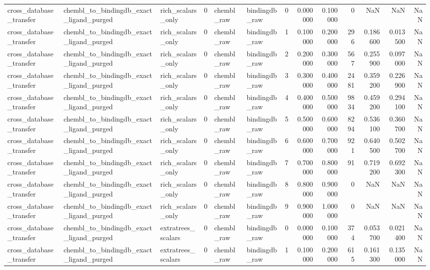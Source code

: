 \begin{longtable}{lllrllrrrrrrr}
cross\_database\_transfer & chembl\_to\_bindingdb\_exact\_ligand\_purged & rich\_scalars\_only & 0 & chembl\_raw & bindingdb\_raw & 0 & 0.000000 & 0.100000 & 0 & NaN & NaN & NaN \\
cross\_database\_transfer & chembl\_to\_bindingdb\_exact\_ligand\_purged & rich\_scalars\_only & 0 & chembl\_raw & bindingdb\_raw & 1 & 0.100000 & 0.200000 & 296 & 0.186600 & 0.013500 & NaN \\
cross\_database\_transfer & chembl\_to\_bindingdb\_exact\_ligand\_purged & rich\_scalars\_only & 0 & chembl\_raw & bindingdb\_raw & 2 & 0.200000 & 0.300000 & 567 & 0.255900 & 0.097000 & NaN \\
cross\_database\_transfer & chembl\_to\_bindingdb\_exact\_ligand\_purged & rich\_scalars\_only & 0 & chembl\_raw & bindingdb\_raw & 3 & 0.300000 & 0.400000 & 2481 & 0.359200 & 0.226900 & NaN \\
cross\_database\_transfer & chembl\_to\_bindingdb\_exact\_ligand\_purged & rich\_scalars\_only & 0 & chembl\_raw & bindingdb\_raw & 4 & 0.400000 & 0.500000 & 9834 & 0.459200 & 0.294100 & NaN \\
cross\_database\_transfer & chembl\_to\_bindingdb\_exact\_ligand\_purged & rich\_scalars\_only & 0 & chembl\_raw & bindingdb\_raw & 5 & 0.500000 & 0.600000 & 8294 & 0.536100 & 0.360700 & NaN \\
cross\_database\_transfer & chembl\_to\_bindingdb\_exact\_ligand\_purged & rich\_scalars\_only & 0 & chembl\_raw & bindingdb\_raw & 6 & 0.600000 & 0.700000 & 921 & 0.640500 & 0.502700 & NaN \\
cross\_database\_transfer & chembl\_to\_bindingdb\_exact\_ligand\_purged & rich\_scalars\_only & 0 & chembl\_raw & bindingdb\_raw & 7 & 0.700000 & 0.800000 & 91 & 0.719200 & 0.692300 & NaN \\
cross\_database\_transfer & chembl\_to\_bindingdb\_exact\_ligand\_purged & rich\_scalars\_only & 0 & chembl\_raw & bindingdb\_raw & 8 & 0.800000 & 0.900000 & 0 & NaN & NaN & NaN \\
cross\_database\_transfer & chembl\_to\_bindingdb\_exact\_ligand\_purged & rich\_scalars\_only & 0 & chembl\_raw & bindingdb\_raw & 9 & 0.900000 & 1.000000 & 0 & NaN & NaN & NaN \\
cross\_database\_transfer & chembl\_to\_bindingdb\_exact\_ligand\_purged & extratrees\_scalars & 0 & chembl\_raw & bindingdb\_raw & 0 & 0.000000 & 0.100000 & 374 & 0.053700 & 0.021400 & NaN \\
cross\_database\_transfer & chembl\_to\_bindingdb\_exact\_ligand\_purged & extratrees\_scalars & 0 & chembl\_raw & bindingdb\_raw & 1 & 0.100000 & 0.200000 & 615 & 0.161300 & 0.135000 & NaN \\

\end{longtable}
